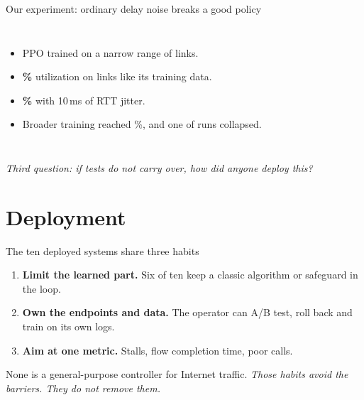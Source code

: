 \documentclass[aspectratio=169,12pt]{beamer}
\newcommand{\bridge}[1]{\vfill{\small\color{accent}\textit{#1}}\vskip2pt}
\begin{document}
\begin{frame}{Our experiment: ordinary delay noise breaks a good policy}
\begin{columns}[c]
\begin{itemize}\setlength\itemsep{3mm}
  \item PPO trained on a narrow range of links.
  \item \textbf{\nCsNarrowRefUtil\%} utilization on links like its training data.
  \item \textbf{\nCsNarrowJitterTenUtil\%} with 10\,ms of RTT jitter.
  \item Broader training reached \nCsBroadJitterTenUtil\%, and one of \nCsSeeds{} runs collapsed.
\end{itemize}
\centering
{}
\end{columns}
\bridge{Third question: if tests do not carry over, how did anyone deploy this?}
\end{frame}

\section{Deployment}

\begin{frame}{The ten deployed systems share three habits}
\begin{enumerate}\setlength\itemsep{5mm}
  \item \textbf{Limit the learned part.} Six of ten keep a classic algorithm or safeguard in the loop.
  \item \textbf{Own the endpoints and data.} The operator can A/B test, roll back and train on its own logs.
  \item \textbf{Aim at one metric.} Stalls, flow completion time, poor calls.
\end{enumerate}
\vspace{5mm}
None is a general-purpose controller for Internet traffic.
\bridge{Those habits avoid the barriers. They do not remove them.}
\end{frame}
\end{document}
